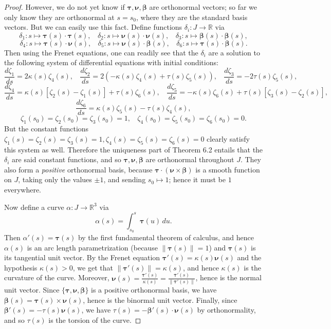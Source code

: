 \documentclass[leqno]{book}
\begin{document}
\begin{proof}
However, we do not yet know if $\boldsymbol\tau,\boldsymbol\nu,\boldsymbol\beta$ are orthonormal vectors; so far we only know they are orthonormal at $s=s_0$, where they are the standard basis vectors.  But we can easily use this fact.  Define functions $\delta_i:J\to\mathbb R$ via
$$\delta_1:s\mapsto\boldsymbol\tau(s)\cdot\boldsymbol\tau(s),~~~~\delta_2:s\mapsto\boldsymbol\nu(s)\cdot\boldsymbol\nu(s),~~~~\delta_3:s\mapsto\boldsymbol\beta(s)\cdot\boldsymbol\beta(s),$$
$$\delta_4:s\mapsto\boldsymbol\tau(s)\cdot\boldsymbol\nu(s),~~~~\delta_5:s\mapsto\boldsymbol\nu(s)\cdot\boldsymbol\beta(s),~~~~\delta_6:s\mapsto\boldsymbol\tau(s)\cdot\boldsymbol\beta(s).$$
Then using the Frenet equations, one can readily see that the $\delta_i$ are a solution to the following system of differential equations with initial conditions:
$$\frac{d\zeta_1}{ds}=2\kappa(s)\zeta_4(s),~~~~\frac{d\zeta_2}{ds}=2(-\kappa(s)\zeta_4(s)+\tau(s)\zeta_5(s)),~~~~\frac{d\zeta_3}{ds}=-2\tau(s)\zeta_5(s),$$
$$\frac{d\zeta_4}{ds}=\kappa(s)[\zeta_2(s)-\zeta_1(s)]+\tau(s)\zeta_6(s),~~~~\frac{d\zeta_5}{ds}=-\kappa(s)\zeta_6(s)+\tau(s)[\zeta_3(s)-\zeta_2(s)],$$
$$\frac{d\zeta_6}{ds}=\kappa(s)\zeta_5(s)-\tau(s)\zeta_4(s),$$
$$\zeta_1(s_0)=\zeta_2(s_0)=\zeta_3(s_0)=1,~~~~\zeta_4(s_0)=\zeta_5(s_0)=\zeta_6(s_0)=0.$$
But the constant functions $\zeta_1(s)=\zeta_2(s)=\zeta_3(s)=1,\zeta_4(s)=\zeta_5(s)=\zeta_6(s)=0$ clearly satisfy this system as well.  Therefore the uniqueness part of Theorem 6.2 entails that the $\delta_i$ are said constant functions, and so $\boldsymbol\tau,\boldsymbol\nu,\boldsymbol\beta$ are orthonormal throughout $J$.  They also form a \emph{positive} orthonormal basis, because $\boldsymbol\tau\cdot(\boldsymbol\nu\times\boldsymbol\beta)$ is a smooth function on $J$, taking only the values $\pm 1$, and sending $s_0\mapsto 1$; hence it must be $1$ everywhere.

Now define a curve $\alpha:J\to\mathbb R^3$ via
$$\alpha(s)=\int_{s_0}^s\boldsymbol\tau(u)\,du.$$
Then $\alpha'(s)=\boldsymbol\tau(s)$ by the first fundamental theorem of calculus, and hence $\alpha(s)$ is an arc length parametrization (because $\|\boldsymbol\tau(s)\|=1$) and $\boldsymbol\tau(s)$ is its tangential unit vector.  By the Frenet equation $\boldsymbol\tau'(s)=\kappa(s)\boldsymbol\nu(s)$ and the hypothesis $\kappa(s)>0$, we get that $\|\boldsymbol\tau'(s)\|=\kappa(s)$, and hence $\kappa(s)$ is the curvature of the curve.  Moreover, $\boldsymbol\nu(s)=\frac{\boldsymbol\tau'(s)}{\kappa(s)}=\frac{\boldsymbol\tau'(s)}{\|\boldsymbol\tau'(s)\|}$, hence is the normal unit vector.  Since $\{\boldsymbol\tau,\boldsymbol\nu,\boldsymbol\beta\}$ is a positive orthonormal basis, we have $\boldsymbol\beta(s)=\boldsymbol\tau(s)\times\boldsymbol\nu(s)$, hence is the binormal unit vector.  Finally, since $\boldsymbol\beta'(s)=-\tau(s)\boldsymbol\nu(s)$, we have $\tau(s)=-\boldsymbol\beta'(s)\cdot\boldsymbol\nu(s)$ by orthonormality, and so $\tau(s)$ is the torsion of the curve.


\end{proof}
\end{document}
